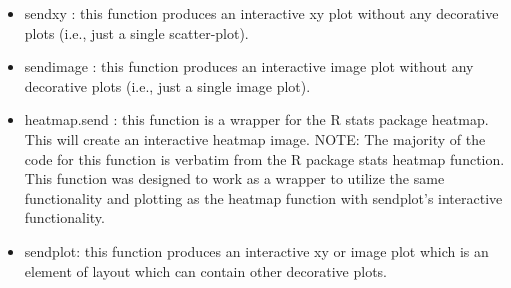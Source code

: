 \documentclass[]{article}
\begin{document}
\begin{itemize}
\item sendxy : this function produces an interactive xy plot without any decorative plots (i.e., just a single scatter-plot).
\item sendimage :  this function produces an interactive image plot without any decorative plots (i.e., just a single image plot).
\item heatmap.send : this function is a wrapper for the R stats package heatmap. This will
create an interactive heatmap image. NOTE: The majority of the code for
this function is verbatim from the R package stats heatmap
function. This function was designed to work as a wrapper to utilize
the same functionality and plotting as the heatmap function with
sendplot's interactive functionality.
\item sendplot: this function produces an interactive xy or image plot which is an element of layout which can contain other decorative plots. 
\end{itemize}
\end{document}
